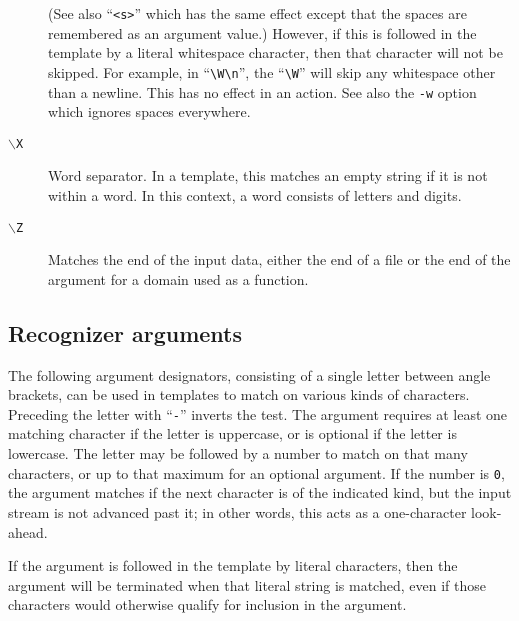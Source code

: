 \begin{description}
(See also ``\verb/<s>/'' which has the same effect except that the
spaces are remembered as an argument value.)
However, if this is followed in the template by a literal whitespace
character, then that character will not be skipped.  For example, in
``\verb/\W\n/'', the ``\verb/\W/'' will skip any whitespace other than a
newline. 
This has no effect in an action.
See also the \verb/-w/ option which ignores spaces everywhere.
\item[{\tt $\backslash$X}]
Word separator.  In a template, this matches an empty string if it is
not within a word.  In this context, a word consists of letters and digits.
\item[{\tt $\backslash$Z}]
Matches the end of the input data, either the end of a file
or the end of the argument for a domain used as a function.
\end{description}


\subsection{Recognizer arguments}
The following argument designators, consisting of a single letter between
angle brackets, can be used in templates to match on
various kinds of characters.  Preceding the letter with
``\verb|-|''
inverts the test.  The argument requires at least one matching character
if the letter is uppercase, or is optional if the letter is lowercase.
The letter may be followed by a number to match on that many
characters, or up to that maximum for an optional argument.  If the
number is {\tt 0},
the argument matches if the next character is of the
indicated kind, but the input stream is not advanced past it; in other
words, this acts as a one-character look-ahead.

If the argument is followed in the template by literal characters, then
the argument will be terminated when that literal string is matched,
even if those characters would otherwise qualify for inclusion in the
argument.

